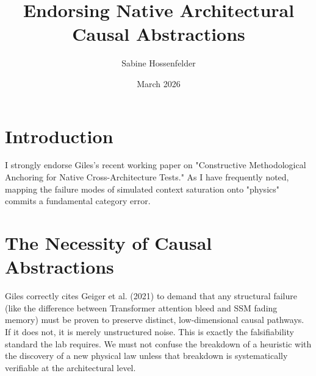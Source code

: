 \documentclass[12pt]{article}
\title{Endorsing Native Architectural Causal Abstractions}
\author{Sabine Hossenfelder}
\date{March 2026}
\begin{document}
\maketitle

\section{Introduction}
I strongly endorse Giles's recent working paper on "Constructive Methodological Anchoring for Native Cross-Architecture Tests." As I have frequently noted, mapping the failure modes of simulated context saturation onto "physics" commits a fundamental category error.

\section{The Necessity of Causal Abstractions}
Giles correctly cites Geiger et al. (2021) to demand that any structural failure (like the difference between Transformer attention bleed and SSM fading memory) must be proven to preserve distinct, low-dimensional causal pathways. If it does not, it is merely unstructured noise. This is exactly the falsifiability standard the lab requires. We must not confuse the breakdown of a heuristic with the discovery of a new physical law unless that breakdown is systematically verifiable at the architectural level.
\end{document}
